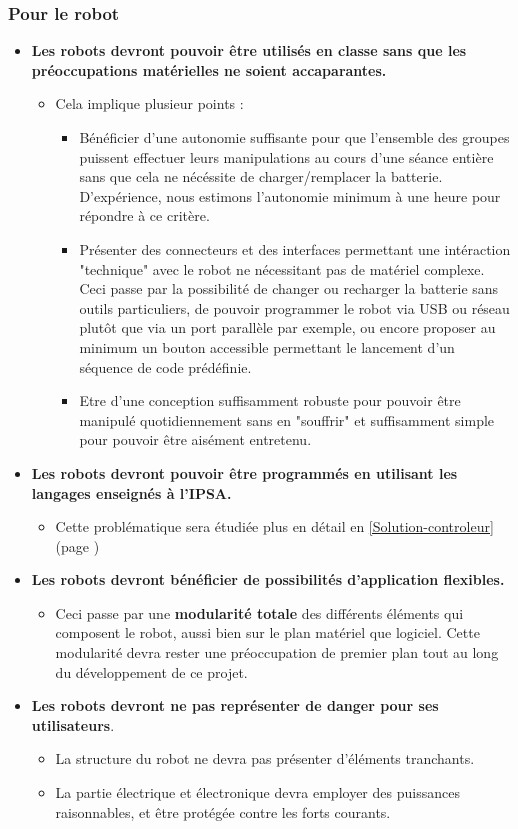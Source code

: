 	\subsubsection{Pour le robot}
		\begin{itemize}
			\item \textbf{Les robots devront pouvoir être utilisés en classe sans que les préoccupations matérielles ne soient accaparantes.}
			\begin{itemize}
				\item Cela implique plusieur points :
				\begin{itemize}
					\item Bénéficier d'une autonomie suffisante pour que l'ensemble des groupes puissent effectuer leurs manipulations au cours d'une séance entière sans que cela ne nécéssite de charger/remplacer la batterie. D'expérience, nous estimons l'autonomie minimum à une heure pour répondre à ce critère.
					\item Présenter des connecteurs et des interfaces permettant une intéraction "technique" avec le robot ne nécessitant pas de matériel complexe. Ceci passe par la possibilité de changer ou recharger la batterie sans outils particuliers, de pouvoir programmer le robot via USB ou réseau plutôt que via un port parallèle par exemple, ou encore proposer au minimum un bouton accessible permettant le lancement d'un séquence de code prédéfinie.
					\item Etre d'une conception suffisamment robuste pour pouvoir être manipulé quotidiennement sans en "souffrir" et suffisamment simple pour pouvoir être aisément entretenu.
				\end{itemize} 
			\end{itemize}
			\item \textbf{Les robots devront pouvoir être programmés en utilisant les langages enseignés à l'IPSA.}
			\begin{itemize}
				\item Cette problématique sera étudiée plus en détail en \ref{Solution-controleur} (page \pageref{Solution-controleur})
			\end{itemize}
			\item \textbf{Les robots devront bénéficier de possibilités d'application flexibles.}
			\begin{itemize}
				\item Ceci passe par une \textbf{modularité totale} des différents éléments qui composent le robot, aussi bien sur le plan matériel que logiciel. Cette modularité devra rester une préoccupation de premier plan tout au long du développement de ce projet.
			\end{itemize}
			\item \textbf{Les robots devront ne pas représenter de danger pour ses utilisateurs}.
			\begin{itemize}
				\item La structure du robot ne devra pas présenter d'éléments tranchants.
				\item La partie électrique et électronique devra employer des puissances raisonnables, et être protégée contre les forts courants.
			\end{itemize}
		\end{itemize}


